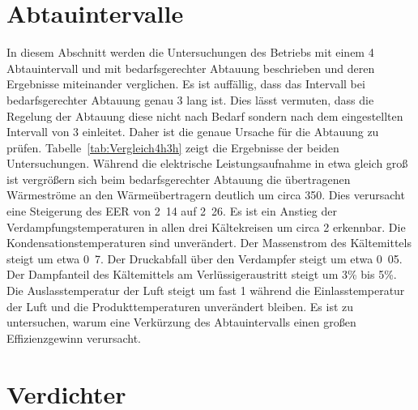 \section{Abtauintervalle}
\label{sec:Abtauintervalle}

In diesem Abschnitt werden die Untersuchungen des Betriebs mit einem \unit{4}{\hour} Abtauintervall und mit bedarfsgerechter Abtauung beschrieben und deren Ergebnisse miteinander verglichen. 
Es ist auffällig, dass das Intervall bei bedarfsgerechter Abtauung genau \unit{3}{\hour} lang ist. Dies lässt vermuten, dass die Regelung der Abtauung diese nicht nach Bedarf sondern nach dem eingestellten Intervall von \unit{3}{\hour} einleitet. Daher ist die genaue Ursache für die Abtauung zu prüfen. \newline
Tabelle~\ref{tab:Vergleich4h3h} zeigt die Ergebnisse der beiden Untersuchungen.
Während die elektrische Leistungsaufnahme in etwa gleich groß ist vergrößern sich beim bedarfsgerechter Abtauung die übertragenen Wärmeströme an den Wärmeübertragern deutlich um circa \unit{350}{\watt}. Dies verursacht eine Steigerung des EER von \unit{2.14}{} auf \unit{2.26}{}.
Es ist ein Anstieg der Verdampfungstemperaturen in allen drei Kältekreisen um circa \unit{2}{\kelvin} erkennbar. Die Kondensationstemperaturen sind unverändert. Der Massenstrom des Kältemittels steigt um etwa \unit{0.7}{\gram\per\second}. Der Druckabfall über den Verdampfer steigt um etwa \unit{0.05}{\bbar}. Der Dampfanteil des Kältemittels am Verlüssigeraustritt steigt um \unit{3}{\%} bis \unit{5}{\%}. Die Auslasstemperatur der Luft steigt um fast \unit{1}{\kelvin} während die Einlasstemperatur der Luft und die Produkttemperaturen unverändert bleiben. \newline
Es ist zu untersuchen, warum eine Verkürzung des Abtauintervalls einen großen Effizienzgewinn verursacht.

 











\clearpage



\section{Verdichter}
\label{sec:Verdichter}


